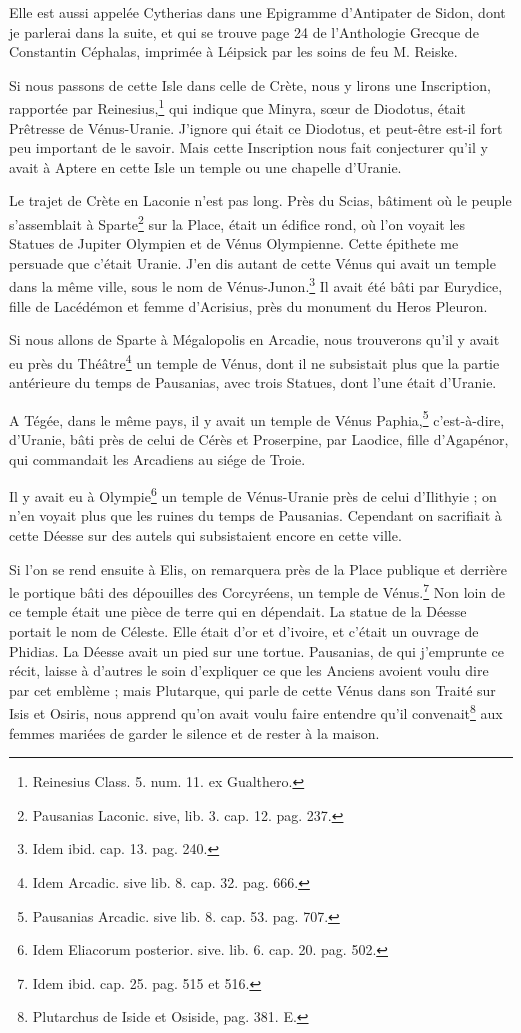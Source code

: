 \documentclass[a4paper, 18pt, oneside]{article}
\begin{document}
Elle est aussi appelée Cytherias dans une Epigramme d'Antipater de Sidon, dont je parlerai dans la suite, et qui se trouve page 24 de l'Anthologie Grecque de Constantin Céphalas, imprimée à Léipsick par les soins de feu M. Reiske.

Si nous passons de cette Isle dans celle de Crète, nous y lirons une Inscription, rapportée par Reinesius,\footnote{Reinesius Class. 5. num. 11. ex Gualthero.} qui indique que Minyra, sœur de Diodotus, était Prêtresse de Vénus-Uranie. J'ignore qui était ce Diodotus, et peut-être est-il fort peu important de le savoir. Mais cette Inscription nous fait conjecturer qu'il y avait à Aptere en cette Isle un temple ou une chapelle d'Uranie.

Le trajet de Crète en Laconie n'est pas long. Près du Scias, bâtiment où le peuple s'assemblait à Sparte\footnote{Pausanias Laconic. sive, lib. 3. cap. 12. pag. 237.} sur la Place, était un édifice rond, où l'on voyait les Statues de Jupiter Olympien et de Vénus Olympienne. Cette épithete me persuade que c'était Uranie. J'en dis autant de cette Vénus qui avait un temple dans la même ville, sous le nom de Vénus-Junon.\footnote{Idem ibid. cap. 13. pag. 240.} Il avait été bâti par Eurydice, fille de Lacédémon et femme d'Acrisius, près du monument du Heros Pleuron.

Si nous allons de Sparte à Mégalopolis en Arcadie, nous trouverons qu'il y avait eu près du Théâtre\footnote{Idem Arcadic. sive lib. 8. cap. 32. pag. 666.} un temple de Vénus, dont il ne subsistait plus que la partie antérieure du temps de Pausanias, avec trois Statues, dont l'une était d'Uranie.

A Tégée, dans le même pays, il y avait un temple de Vénus Paphia,\footnote{Pausanias Arcadic. sive lib. 8. cap. 53. pag. 707.} c'est-à-dire, d'Uranie, bâti près de celui de Cérès et Proserpine, par Laodice, fille d'Agapénor, qui commandait les Arcadiens au siége de Troie.

Il y avait eu à Olympie\footnote{Idem Eliacorum posterior. sive. lib. 6. cap. 20. pag. 502.} un temple de Vénus-Uranie près de celui d'Ilithyie ; on n'en voyait plus que les ruines du temps de Pausanias. Cependant on sacrifiait à cette Déesse sur des autels qui subsistaient encore en cette ville.

Si l'on se rend ensuite à Elis, on remarquera près de la Place publique et derrière le portique bâti des dépouilles des Corcyréens, un temple de Vénus.\footnote{Idem ibid. cap. 25. pag. 515 et 516.} Non loin de ce temple était une pièce de terre qui en dépendait. La statue de la Déesse portait le nom de Céleste. Elle était d'or et d'ivoire, et c'était un ouvrage de Phidias. La Déesse avait un pied sur une tortue. Pausanias, de qui j'emprunte ce récit, laisse à d'autres le soin d'expliquer ce que les Anciens avoient voulu dire par cet emblème ; mais Plutarque, qui parle de cette Vénus dans son Traité sur Isis et Osiris, nous apprend qu'on avait voulu faire entendre qu'il convenait\footnote{Plutarchus de Iside et Osiside, pag. 381. E.} aux femmes mariées de garder le silence et de rester à la maison.
\end{document}
